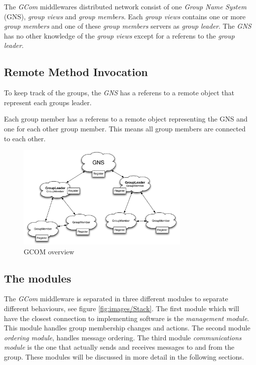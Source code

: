 \documentclass[titlepage, twocolumn, a4paper, 10pt]{article}
\begin{document}

The \textit{GCom} middlewares distributed network consist of one
\textit{Group Name System} (GNS), \textit{group views} and
\textit{group members}. Each \textit{group views} contains
one or more \textit{group members} and one of these
\textit{group members} servers as \textit{group leader}.
The \textit{GNS} has no other knowledge of the \textit{group views}
except for a referens to the \textit{group leader}.

\subsection{Remote Method Invocation}\label{sec:rmi}
To keep track of the groups, the \textit{GNS} has a referens to a
remote object that represent each groups leader.

Each group member has a referens to a remote object representing the
GNS and one for each other group member. This means all group members
are connected to each other.

\begin{figure}[!thb]
  \centering
  \includegraphics[width=3.3in]{images/Overview.pdf}
  \caption{GCOM overview}
  \label{fig:images/overview}
\end{figure}


\subsection{The modules}\label{sec:modules}

The \textit{GCom} middleware is separated in three different modules
to separate different behaviours, see figure \vref{fig:images/Stack}.
The first module which will have the closest connection to
implementing software is the \textit{management module}. This module
handles group membership changes and actions. The second module
\textit{ordering module}, handles message ordering. The third module
\textit{communications module} is the one that actually sends and
receives messages to and from the group. These modules will be
discussed in more detail in the following sections.
\end{document}
